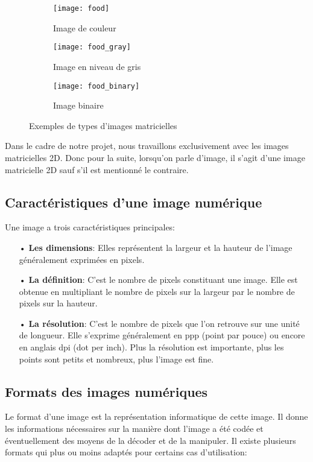     \begin{figure}
        \begin{subfigure}{0.3\textwidth}
            \centering
            \texttt{[image: food]}
            \caption{Image de couleur}
        \end{subfigure}
        \hfill
        \begin{subfigure}{0.3\textwidth}
            \centering
            \texttt{[image: food\_gray]}
            \caption{Image en niveau de gris}
        \end{subfigure}
        \hfill
        \begin{subfigure}{0.3\textwidth}
            \centering
            \texttt{[image: food\_binary]}
            \caption{Image binaire}
        \end{subfigure}
        \caption{Exemples de types d'images matricielles}
    \end{figure}
	Dans le cadre de notre projet, nous travaillons exclusivement avec les images matricielles 2D. Donc pour la suite, lorsqu’on parle d’image, il s'agit d’une image matricielle 2D sauf s’il est mentionné le contraire. 
    \subsection{Caractéristiques d'une image numérique}
    Une image a trois caractéristiques principales:
    \begin{itemize}
        \item[•]\textbf{Les dimensions}: Elles représentent la largeur et la hauteur de l’image généralement exprimées en pixels.
        \item[•]\textbf{La définition}: C’est le nombre de pixels constituant une image. Elle est obtenue en multipliant le nombre de pixels sur la largeur par le nombre de pixels sur la hauteur.
        \item[•]\textbf{La résolution}: C’est le nombre de pixels que l’on retrouve sur une unité de longueur. Elle s’exprime généralement en ppp (point par pouce) ou encore en anglais dpi (dot per inch).  Plus la résolution est importante, plus les points sont petits et nombreux, plus l’image est fine.
    \end{itemize}

    \subsection{Formats des images numériques}
    Le format d’une image est la représentation informatique de cette image. Il donne les informations nécessaires sur la manière dont l’image a été codée et éventuellement des moyens de la décoder et de la manipuler. Il existe plusieurs formats qui plus ou moins adaptés pour certains cas d’utilisation:

